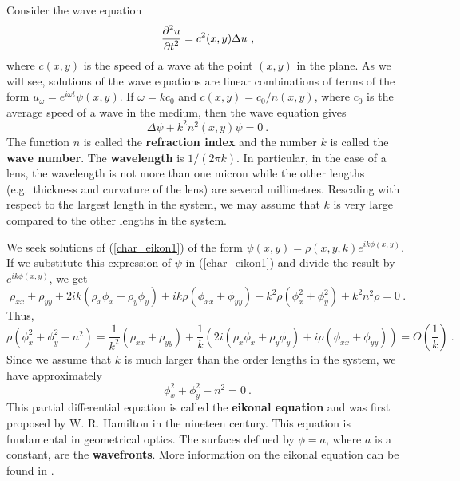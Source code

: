 \begin{egg}
Consider the wave equation                   \label{char_egg_eikonal}
\[
\frac{\displaystyle \partial^{2}{u}} {\displaystyle \partial t^{2}} = c^2(x,y) \Delta u \ ,
\]
where $c(x,y)$ is the speed of a wave at the point $(x,y)$ in the
plane.  As we will see, solutions of the wave equations are linear
combinations of terms of the form
$\displaystyle u_\omega = e^{i\omega t} \psi(x,y)$.
If $\omega = k c_0$ and $c(x,y) = c_0/n(x,y)$, where $c_0$ is the
average speed of a wave in the medium, then the wave equation gives
\begin{equation} \label{char_eikon1}
\Delta \psi + k^2 n^2(x,y) \psi = 0 \ .
\end{equation}
The function $n$ is called the
{\bfseries refraction index} and the
number $k$ is called the {\bfseries wave number}.  The
{\bfseries wavelength} is $1/(2\pi k)$.  In
particular, in the case of a lens, the wavelength is not more than one
micron while the other lengths (e.g.\ thickness and curvature of the
lens) are several millimetres.  Rescaling with respect to the largest
length in the system, we may assume that $k$ is very large compared to
the other lengths in the system.

We seek solutions of (\ref{char_eikon1}) of the form
$\displaystyle \psi(x,y) = \rho(x,y,k) e^{ik\phi(x,y)}$.
If we substitute this expression of $\psi$ in (\ref{char_eikon1}) and
divide the result by $\displaystyle e^{ik\phi(x,y)}$, we get
\[
\rho_{xx}+\rho_{yy} + 2ik\left(\rho_x\phi_x+\rho_y\phi_y\right)
+ ik\rho \left(\phi_{xx} + \phi_{yy}\right)
-k^2 \rho\left( \phi_x^2 + \phi_y^2\right) + k^2 n^2\rho = 0 \  .
\]
Thus,
\[
\rho\left( \phi_x^2 + \phi_y^2 - n^2\right) =
\frac{1}{k^2} \left(\rho_{xx}+\rho_{yy}\right) +
\frac{1}{k} \left( 2i\left(\rho_x\phi_x+\rho_y\phi_y\right)
+ i\rho \left(\phi_{xx} + \phi_{yy}\right) \right) =
O\left(\frac{1}{k}\right) \ .
\]
Since we assume that $k$ is much larger than the order lengths in the
system, we have approximately
\begin{equation} \label{char_eikonal}
\phi_x^2 + \phi_y^2 - n^2 = 0 \ .
\end{equation}
This partial differential equation is called the
{\bfseries eikonal equation} and was first
proposed by W. R. Hamilton in the nineteen century.  This equation is
fundamental in geometrical optics.  The surfaces defined by $\phi = a$,
where $a$ is a constant, are the {\bfseries wavefronts}.
More information on the eikonal equation can be found in
\cite{J,McO,PinRub}.


\end{egg}
